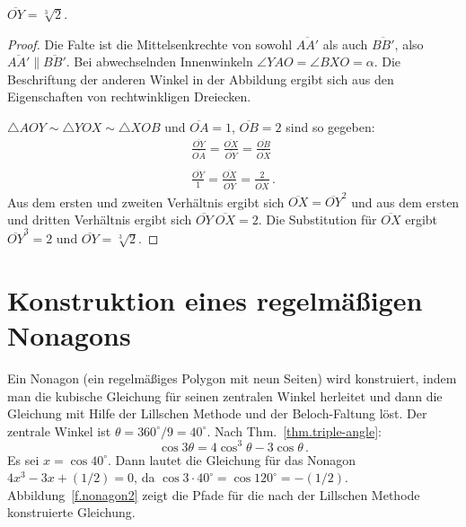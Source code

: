\begin{theorem}
$\overline{OY}=\sqrt[3]{2}$.
\end{theorem}
\begin{proof}
Die Falte ist die Mittelsenkrechte von sowohl $\overline{AA'}$ als auch $\overline{BB'}$, also $\overline{AA'}\parallel\overline{BB'}$. Bei abwechselnden Innenwinkeln $\angle YAO =\angle BXO=\alpha$. Die Beschriftung der anderen Winkel in der Abbildung ergibt sich aus den Eigenschaften von rechtwinkligen Dreiecken.

$\triangle AOY\sim \triangle YOX \sim \triangle XOB$ und $\overline{OA}=1$, $\overline{OB}=2$ sind so gegeben:
\[
\begin{array}{l}
\displaystyle\frac{\overline{OY}}{\overline{OA}}=\displaystyle\frac{\overline{OX}}{\overline{OY}}=\displaystyle\frac{\overline{OB}}{\overline{OX}}\\
\\
\displaystyle\frac{\overline{OY}}{1}=\displaystyle\frac{\overline{OX}}{\overline{OY}}=\displaystyle\frac{2}{\overline{OX}}\,.
\end{array}
\]
Aus dem ersten und zweiten Verhältnis ergibt sich $\overline{OX}=\overline{OY}^2$ und aus dem ersten und dritten Verhältnis ergibt sich $\overline{OY}\:\overline{OX}=2$.
Die Substitution für $\overline{OX}$ ergibt $\overline{OY}^3=2$ und
$\overline{OY}=\sqrt[3]{2}$.
\end{proof}


\section{Konstruktion eines regelmäßigen Nonagons}\label{s.nonagon}

Ein Nonagon (ein regelmäßiges Polygon mit neun Seiten) wird konstruiert, indem man die kubische Gleichung für seinen zentralen Winkel herleitet und dann die Gleichung mit Hilfe der Lillschen Methode und der Beloch-Faltung löst. Der zentrale Winkel ist $\theta=360^\circ/9=40^\circ$. Nach Thm.~\ref{thm.triple-angle}:
\[
\cos 3\theta=4\cos^3 \theta -3\cos\theta\,.
\]
Es sei $x=\cos 40^{\circ}$. Dann lautet die Gleichung für das Nonagon $4x^3-3x+(1/2)=0$, da $\cos 3\cdot 40^\circ=\cos 120^\circ=-(1/2)$. Abbildung~\ref{f.nonagon2} zeigt die Pfade für die nach der Lillschen Methode konstruierte Gleichung.

